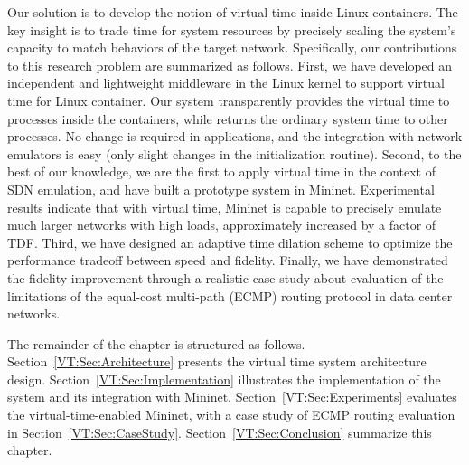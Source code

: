 Our solution is to develop the notion of virtual time inside Linux containers.
The key insight is to trade time for system resources by precisely scaling the system's capacity to match behaviors of the target network.
Specifically, our contributions to this research problem are summarized as follows. 
First, we have developed an independent and lightweight middleware in the Linux kernel to support virtual time for Linux container. 
Our system transparently provides the virtual time to processes inside the containers, while returns the ordinary system time to other processes. 
No change is required in applications, and the integration with network emulators is easy (only slight changes in the initialization routine). 
Second, to the best of our knowledge, we are the first to apply virtual time in the context of SDN emulation, and have built a prototype system in Mininet. 
Experimental results indicate that with virtual time, Mininet is capable to precisely emulate much larger networks with high loads, approximately increased by a factor of TDF. 
Third, we have designed an adaptive time dilation scheme to optimize the performance tradeoff between speed and fidelity. 
Finally, we have demonstrated the fidelity improvement through a realistic case study about evaluation of the limitations of
the equal-cost multi-path (ECMP) routing protocol in data center networks.

The remainder of the chapter is structured as follows. Section~\ref{VT:Sec:Architecture} presents the virtual time system architecture design. 
Section~\ref{VT:Sec:Implementation} illustrates the implementation of the system and its integration with Mininet.
Section~\ref{VT:Sec:Experiments} evaluates the virtual-time-enabled Mininet, with a case study of ECMP routing evaluation in Section~\ref{VT:Sec:CaseStudy}. 
Section~\ref{VT:Sec:Conclusion} summarize this chapter.
